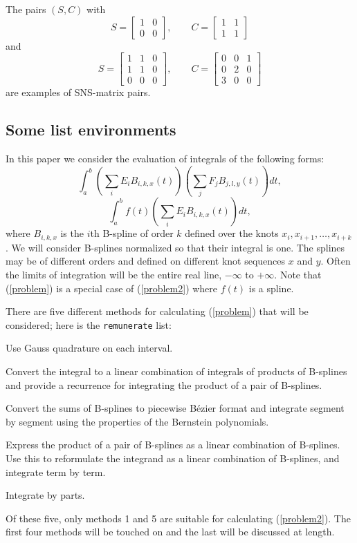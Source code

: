 \documentclass{SIAMGHbook2016}
\begin{document}
The pairs $(S,C)$ with
\[S=\left[\begin{array}{cc}1&0\\0&0\end{array}\right],\qquad
C=\left[\begin{array}{cc}1&1\\1&1\end{array}\right]\] and
\[S=\left[\begin{array}{ccc}1&1&0\\1&1&0\\0&0&0\end{array}\right],\qquad
C=\left[\begin{array}{ccc}0&0&1\\0&2&0\\
3&0&0\end{array}\right]\] are examples of SNS-matrix pairs.

\subsection{Some list environments}
In this paper we consider the evaluation of integrals of the
following forms:
\begin{equation}
\int_a^b \left( \sum_i E_i B_{i,k,x}(t) \right)
         \left( \sum_j F_j B_{j,l,y}(t) \right) dt,\label{problem}
\end{equation}
\begin{equation}
\int_a^b f(t) \left( \sum_i E_i B_{i,k,x}(t) \right) dt,\label{problem2}
\end{equation}
where $B_{i,k,x}$ is the $i$th B-spline of order $k$ defined over the
knots $x_i, x_{i+1}, \ldots, x_{i+k}$.
We will consider B-splines normalized so that their integral is one.
The splines may be of different orders and
defined on different knot sequences $x$ and $y$.
Often the limits of integration will be the entire real line, $-\infty$
to $+\infty$. Note that (\ref{problem}) is a special case of (\ref{problem2})
where $f(t)$ is a spline.


There are five different methods for calculating (\ref{problem})
that will be considered; here is the \verb+remunerate+ list:
\begin{remunerate}
\item Use Gauss quadrature on each interval.
\item Convert the integral to a linear combination of
      integrals of products of B-splines and provide a recurrence for
      integrating the product of a pair of B-splines.
\item Convert the sums of B-splines to piecewise
      B\'{e}zier format and integrate segment
      by segment using the properties of the Bernstein polynomials.
\item Express the product of a pair of B-splines as a linear combination
      of B-splines.
      Use this to reformulate the integrand as a linear combination
      of B-splines, and integrate term by term.
\item Integrate by parts.
\end{remunerate}
Of these five, only methods 1 and 5 are suitable for calculating
(\ref{problem2}). The first four methods will be touched on and the
last will be discussed at length.
\end{document}
